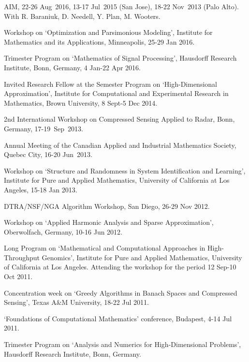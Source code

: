 \documentclass[11pt]{article}
\begin{document}
AIM, 22-26 Aug~2016, 13-17 Jul~2015 (San Jose), 18-22 Nov~2013 (Palo Alto). With R. Baraniuk, D. Needell, Y. Plan, M. Wooters.
\item Workshop on `Optimization and Parsimonious Modeling', 
Institute for Mathematics and its Applications, Minneapolis, 25-29 Jan 2016.
\item Trimester Program on `Mathematics of Signal Processing', Hausdorff Research Institute, Bonn, Germany,
4 Jan-22 Apr 2016.
\item Invited Research Fellow at the Semester Program on `High-Dimensional Approximation', 
Institute for Computational and Experimental Research in Mathematics, Brown University,
8 Sept-5 Dec 2014.
\item 2nd International Workshop on Compressed Sensing Applied to Radar,
Bonn, Germany, 17-19~Sep~2013.
\item Annual Meeting of the Canadian Applied
and Industrial Mathematics Society, Quebec City, 16-20 Jun~2013. 
\item Workshop on `Structure and Randomness in System Identification and Learning',
Institute for Pure and Applied Mathematics, University of California at Los Angeles, 15-18 Jan 2013.
\item DTRA/NSF/NGA Algorithm Workshop, San Diego, 26-29 Nov 2012.
\item Workshop on `Applied Harmonic Analysis and Sparse Approximation', Oberwolfach, Germany, 10-16 Jun 2012.
\item Long Program on `Mathematical and Computational Approaches in High-Throughput Genomics', 
Institute for Pure and Applied Mathematics, University of California at Los Angeles.
Attending the workshop for the period 12 Sep-10 Oct 2011.
\item Concentration week on `Greedy Algorithms in Banach Spaces and Compressed Sensing', Texas A\&M University, 18-22 Jul 2011.
\item `Foundations of Computational Mathematics' conference, Budapest, 4-14 Jul 2011.
\item Trimester Program on `Analysis and Numerics for High-Dimensional Problems', Hausdorff Research Institute, Bonn, Germany.
\end{document}
